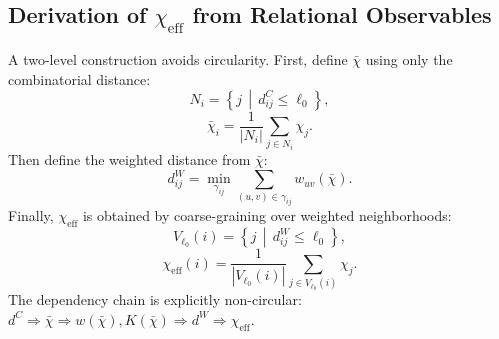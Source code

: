 \subsection{Derivation of \texorpdfstring{$\chi_{\mathrm{eff}}$}{χeff} from Relational Observables}
\label{app:chi-eff-derivation}

A two-level construction avoids circularity.
First, define $\bar{\chi}$ using only the combinatorial distance:
\begin{equation}
  N_i = \left\{ j \,\middle|\,
    d_{ij}^{C} \le \ell_0 \right\},
  \label{eq:combinatorial_neighborhood}
\end{equation}
\begin{equation}
  \bar{\chi}_i
  = \frac{1}{|N_i|}
    \sum_{j\in N_i} \chi_j.
  \label{eq:relational_average_bar_chi}
\end{equation}
Then define the weighted distance from $\bar{\chi}$:
\begin{equation}
  d_{ij}^{W}
  = \min_{\gamma_{ij}}
    \sum_{(u,v)\in\gamma_{ij}} w_{uv}(\bar{\chi}).
  \label{eq:weighted_distance}
\end{equation}
Finally, $\chi_{\mathrm{eff}}$ is obtained by coarse-graining over
weighted neighborhoods:
\begin{equation}
  V_{\ell_0}(i)
  = \left\{ j \,\middle|\,
    d_{ij}^{W} \le \ell_0 \right\},
  \label{eq:weighted_neighborhood}
\end{equation}
\begin{equation}
  \chi_{\mathrm{eff}}(i)
  = \frac{1}{|V_{\ell_0}(i)|}
    \sum_{j\in V_{\ell_0}(i)} \chi_j.
  \label{eq:chi_eff_definition}
\end{equation}
The dependency chain is explicitly non-circular:
$d^{C} \Rightarrow \bar{\chi} \Rightarrow w(\bar{\chi}),K(\bar{\chi})
  \Rightarrow d^{W} \Rightarrow \chi_{\mathrm{eff}}$.
